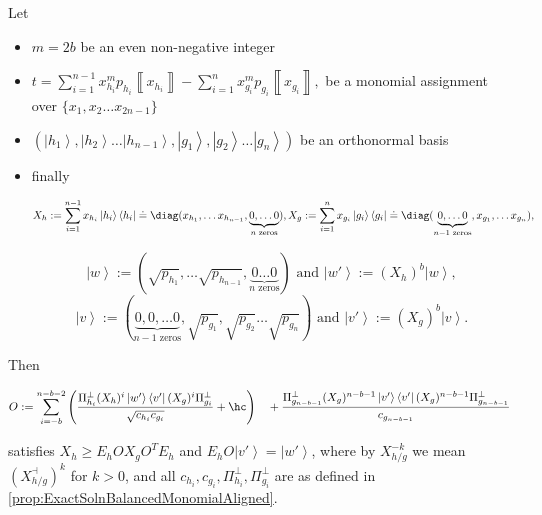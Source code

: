 \documentclass{article}
\begin{document}
\begin{proposition}
  \label{prop:ExactSolnUnbalancedMonomialAligned} Let
  \begin{itemize}
    \item $m=2b$ be an even non-negative integer
    \item $
            t=\sum_{i=1}^{n-1}x_{h_{i}}^{m}p_{h_{i}}\left\llbracket x_{h_{i}}\right\rrbracket -\sum_{i=1}^{n}x_{g_{i}}^{m}p_{g_{i}}\left\llbracket x_{g_{i}}\right\rrbracket ,
          $ be a monomial assignment over $\{x_{1},x_{2}\dots x_{2n-1}\}$
    \item $\left(\left|h_{1}\right\rangle ,\left|h_{2}\right\rangle \dots\left|h_{n-1}\right\rangle ,\left|g_{1}\right\rangle ,\left|g_{2}\right\rangle \dots\left|g_{n}\right\rangle \right)$
          be an orthonormal basis
    \item finally
          \begin{footnotesize}
            \begin{displaymath}
              X_{h}:=\sum_{i=1}^{n-1}x_{h_{i}}\left|h_{i}\right\rangle \left\langle h_{i}\right|\doteq\diag(x_{h_{1}},\dots x_{h_{n-1}},\underbrace{0,\dots0}_{n\text{ zeros}}),
              X_{g}:=\sum_{i=1}^{n}x_{g_{i}}\left|g_{i}\right\rangle \left\langle g_{i}\right|\doteq\diag(\underbrace{0,\dots0}_{n-1\text{ zeros}},x_{g_{1}},\dots x_{g_{n}}),
            \end{displaymath}
          \end{footnotesize}
          \begin{displaymath}
            \left|w\right\rangle :=(\sqrt{p_{h_{1}}},\dots\sqrt{p_{h_{n-1}}},\underbrace{0\dots0}_{n\text{ zeros}}) \text{ and }\left|w'\right\rangle :=(X_{h})^{b}\left|w\right\rangle,
          \end{displaymath}
          \begin{displaymath}
            \left|v\right\rangle :=(\underbrace{0,0,\dots0}_{n-1\text{ zeros}},\sqrt{p_{g_{1}}},\sqrt{p_{g_{2}}}\dots\sqrt{p_{g_{n}}}) \text{ and }\left|v'\right\rangle :=(X_{g})^{b}\left|v\right\rangle.
          \end{displaymath}
  \end{itemize}
  Then \begin{small}
    \begin{align*}
      O  :=\sum_{i=-b}^{n-b-2}\left(\frac{\Pi_{h_{i}}^{\perp}(X_{h})^{i}\left|w'\right\rangle \left\langle v'\right|(X_{g})^{i}\Pi_{g_{i}}^{\perp}}{\sqrt{c_{h_{i}}c_{g_{i}}}}+\hc\right)
      \quad+\frac{\Pi_{g_{n-b-1}}^{\perp}(X_{g})^{n-b-1}\left|v'\right\rangle \left\langle v'\right|(X_{g})^{n-b-1}\Pi_{g_{n-b-1}}^{\perp}}{c_{g_{n-b-1}}}
    \end{align*}
  \end{small}
  satisfies $X_{h}\ge E_{h}OX_{g}O^{T}E_{h}$ and $E_{h}O\left|v'\right\rangle =\left|w'\right\rangle$,
  where by $X_{h/g}^{-k}$ we mean $(X_{h/g}^{\dashv})^{k}$
  for $k>0$, and all $c_{h_{i}},c_{g_{i}},\Pi_{h_{i}}^{\perp},\Pi_{g_{i}}^{\perp}$
  are as defined in \cref{prop:ExactSolnBalancedMonomialAligned}.
\end{proposition}
\end{document}
